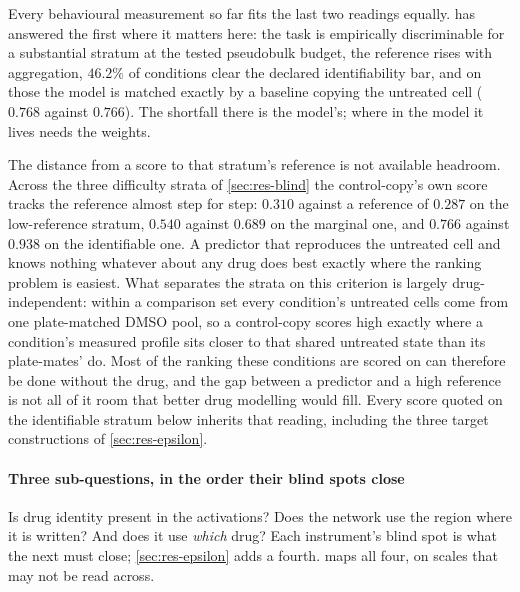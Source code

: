 Every behavioural measurement so far fits the last two readings
equally.
 has answered the first where it matters here: the task is
empirically discriminable for a substantial stratum at the tested pseudobulk
budget, the reference rises with aggregation, $46.2\%$ of conditions clear the
declared identifiability bar, and on those the model is matched exactly by a
baseline copying the untreated cell ($0.768$ against $0.766$). The shortfall there is the model's; where in the model it lives needs the
weights.

\begin{scopelimit}
The distance from a score to that stratum's reference is not available headroom.
Across the three difficulty strata of \cref{sec:res-blind} the control-copy's own
score tracks the reference almost step for step: $0.310$ against a reference of
$0.287$ on the low-reference stratum, $0.540$ against $0.689$ on the marginal one,
and $0.766$ against $0.938$ on the identifiable one. A predictor that reproduces
the untreated cell and knows nothing whatever about any drug does best exactly
where the ranking problem is easiest. What separates the strata on this
criterion is largely drug-independent: within a comparison set every condition's
untreated cells come from one plate-matched DMSO pool, so a control-copy scores
high exactly where a condition's measured profile sits closer to that shared
untreated state than its plate-mates' do. Most of the ranking these conditions
are scored on can therefore be done without the drug, and the gap between a predictor and a high reference is
not all of it room that better drug modelling would fill. Every score quoted on
the identifiable stratum below inherits that reading, including the three target
constructions of \cref{sec:res-epsilon}.
\end{scopelimit}

\paragraph{Three sub-questions, in the order their blind spots close} Is drug
identity present in the activations? Does the network use the region where it is
written? And does it use \emph{which} drug? Each instrument's blind spot is what
the next must close; \cref{sec:res-epsilon} adds a fourth.
 maps all four, on scales that may not be read across.

